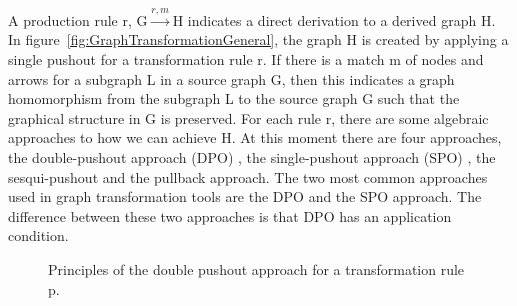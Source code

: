 A production rule r, \mbox{G$\xrightarrow{r,m}$H} indicates a direct
derivation to a derived graph H. In
figure~\ref{fig:GraphTransformationGeneral}, the graph H is created by
applying a single pushout for a transformation rule r. If there is a match m of
nodes and arrows for a subgraph L in a source graph G, then this indicates a
graph homomorphism from the subgraph L to the source graph G such that the
graphical structure in G is preserved. For each rule r, there are some
algebraic approaches to how we can achieve H. At this moment there are four
approaches, the double-pushout approach (DPO) \cite{Loewe1997}, the
single-pushout approach (SPO) \cite{Ehrig1997}, the
sesqui-pushout\cite{Corradini2006} and the pullback approach\cite{Bauderon}.
The two most common approaches used in graph transformation tools are the
DPO and the SPO approach. The difference between these two approaches is that
DPO has an application condition.

 \begin{figure}[H]
 	\centering
 	\caption[The Double Pushout approach]
 	{Principles of the double pushout approach for a transformation rule p.}
 	\label{fig:DPO}
 \end{figure}


